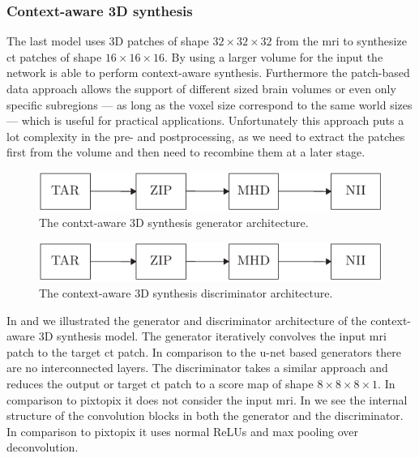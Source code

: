 \subsubsection{Context-aware 3D synthesis}

The last model uses 3D patches of shape $32\times32\times32$ from the
\gls{mri} to synthesize \gls{ct} patches of shape $16\times16\times16$. By
using a larger volume for the input the network is able to perform
context-aware synthesis. Furthermore the patch-based data approach allows the
support of different sized brain volumes or even only specific subregions ---
as long as the voxel size correspond to the same world sizes --- which is
useful for practical applications. Unfortunately this approach puts a lot
complexity in the pre- and postprocessing, as we need to extract the patches
first from the volume and then need to recombine them at a later stage.
\begin{figure}[h]
  \centering
  \includegraphics[page=5,width=\linewidth]{figure/diagrams.pdf}
  \caption{The contxt-aware 3D synthesis generator architecture.
  }\label{fig:synthesis:gen}
\end{figure}
\begin{figure}[h]
  \centering
  \includegraphics[page=6,width=\linewidth]{figure/diagrams.pdf}
  \caption{The context-aware 3D synthesis discriminator architecture.
	}\label{fig:synthesis:disc}
\end{figure}
In  and  we illustrated the
generator and discriminator architecture of the context-aware 3D synthesis
model. The generator iteratively convolves the input \gls{mri} patch to the
target \gls{ct} patch. In comparison to the u-net based generators there
are no interconnected layers. The discriminator takes a similar approach and
reduces the output or target \gls{ct} patch to a score map of shape
$8\times8\times8\times1$. In comparison to pixtopix it does not consider the
input \gls{mri}.
In  we see the internal structure of the
convolution blocks in both the generator and the discriminator. In comparison
to pixtopix it uses normal ReLUs and max pooling over deconvolution.
